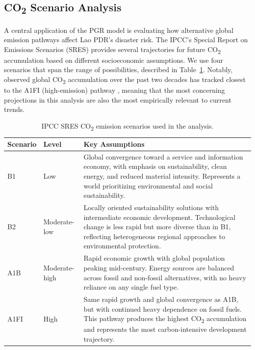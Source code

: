 \documentclass[11pt,a4paper]{article}
\begin{document}
\subsection{CO\textsubscript{2} Scenario Analysis}

A central application of the PGR model is evaluating how alternative global emission pathways affect Lao PDR's disaster risk. The IPCC's Special Report on Emissions Scenarios (SRES) \cite{ipcc2000sres} provides several trajectories for future CO\textsubscript{2} accumulation based on different socioeconomic assumptions. We use four scenarios that span the range of possibilities, described in Table~\ref{tab:ipcc_scenarios}. Notably, observed global CO\textsubscript{2} accumulation over the past two decades has tracked closest to the A1FI (high-emission) pathway \cite{ipcc2021ar6wg1}, meaning that the most concerning projections in this analysis are also the most empirically relevant to current trends.

\begin{table}[H]
  \centering
  \caption{IPCC SRES CO\textsubscript{2} emission scenarios used in the analysis.}
  \label{tab:ipcc_scenarios}
  \small
  \begin{tabular}{llp{9cm}}
    \toprule
    \textbf{Scenario} & \textbf{Level} & \textbf{Key Assumptions} \\
    \midrule
    B1  & Low           & Global convergence toward a service and information economy, with emphasis on sustainability, clean energy, and reduced material intensity. Represents a world prioritizing environmental and social sustainability. \\[4pt]
    B2  & Moderate-low  & Locally oriented sustainability solutions with intermediate economic development. Technological change is less rapid but more diverse than in B1, reflecting heterogeneous regional approaches to environmental protection. \\[4pt]
    A1B & Moderate-high & Rapid economic growth with global population peaking mid-century. Energy sources are balanced across fossil and non-fossil alternatives, with no heavy reliance on any single fuel type. \\[4pt]
    A1FI & High         & Same rapid growth and global convergence as A1B, but with continued heavy dependence on fossil fuels. This pathway produces the highest CO\textsubscript{2} accumulation and represents the most carbon-intensive development trajectory. \\
    \bottomrule
  \end{tabular}
\end{table}
\end{document}
